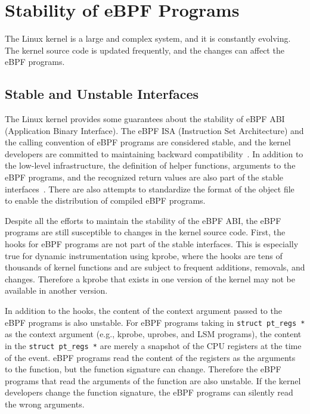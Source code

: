 \section{Stability of eBPF Programs}
\label{sec:stability}




The Linux kernel is a large and complex system, and it is constantly evolving.
The kernel source code is updated frequently, and the changes can affect the eBPF programs.

\subsection{Stable and Unstable Interfaces}
\label{sec:stable_interface}

The Linux kernel provides some guarantees about the stability of eBPF ABI (Application Binary Interface).
The eBPF ISA (Instruction Set Architecture) and the calling convention of eBPF programs are considered stable,
and the kernel developers are committed to maintaining backward compatibility~\cite{bpf-design, bpf-isa}.
In addition to the low-level infrastructure, the definition of helper functions, arguments to the eBPF programs,
and the recognized return values are also part of the stable interfaces~\cite{bpf-design}.
There are also attempts to standardize the format of the object file~\cite{bpf-elf} to enable the distribution of compiled eBPF programs.

Despite all the efforts to maintain the stability of the eBPF ABI, the eBPF programs are still susceptible to changes in the kernel source code.
First, the hooks for eBPF programs are not part of the stable interfaces.
This is especially true for dynamic instrumentation using kprobe,
where the hooks are tens of thousands of kernel functions and are subject to frequent additions, removals, and changes.
Therefore a kprobe that exists in one version of the kernel may not be available in another version.

In addition to the hooks, the content of the context argument passed to the eBPF programs is also unstable.
For eBPF programs taking in \texttt{struct pt\_regs *} as the context argument (e.g., kprobe, uprobes, and LSM programs),
the content in the \texttt{struct pt\_regs *} are merely a snapshot of the CPU registers at the time of the event.
eBPF programs read the content of the registers as the arguments to the function,
but the function signature can change.
Therefore the eBPF programs that read the arguments of the function are also unstable.
If the kernel developers change the function signature, the eBPF programs can silently read the wrong arguments.


